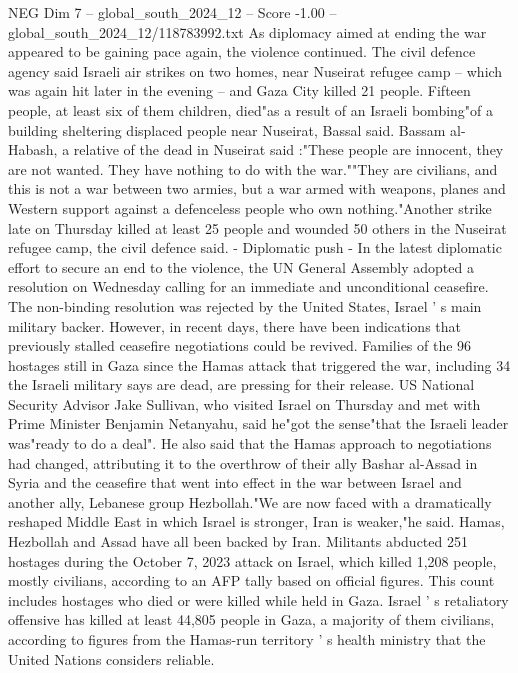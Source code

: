 \begin{textsample}{NEG Dim 7 – global\_south\_2024\_12 – Score -1.00 – global\_south\_2024\_12/118783992.txt}
As diplomacy aimed at ending the war appeared to be gaining pace again, the violence continued.
The civil defence agency said Israeli air strikes on two homes, near Nuseirat refugee camp -- which was again hit later in the evening -- and Gaza City killed 21 people.
Fifteen people, at least six of them children, died"as a result of an Israeli bombing"of a building sheltering displaced people near Nuseirat, Bassal said.
Bassam al-Habash, a relative of the dead in Nuseirat said :"These people are innocent, they are not wanted.
They have nothing to do with the war.""They are civilians, and this is not a war between two armies, but a war armed with weapons, planes and Western support against a defenceless people who own nothing."Another strike late on Thursday killed at least 25 people and wounded 50 others in the Nuseirat refugee camp, the civil defence said. - Diplomatic push - In the latest diplomatic effort to secure an end to the violence, the UN General Assembly adopted a resolution on Wednesday calling for an immediate and unconditional ceasefire.
The non-binding resolution was rejected by the United States, Israel ' s main military backer.
However, in recent days, there have been indications that previously stalled ceasefire negotiations could be revived.
Families of the 96 hostages still in Gaza since the Hamas attack that triggered the war, including 34 the Israeli military says are dead, are pressing for their release.
US National Security Advisor Jake Sullivan, who visited Israel on Thursday and met with Prime Minister Benjamin Netanyahu, said he"got the sense"that the Israeli leader was"ready to do a deal".
He also said that the Hamas approach to negotiations had changed, attributing it to the overthrow of their ally Bashar al-Assad in Syria and the ceasefire that went into effect in the war between Israel and another ally, Lebanese group Hezbollah."We are now faced with a dramatically reshaped Middle East in which Israel is stronger, Iran is weaker,"he said.
Hamas, Hezbollah and Assad have all been backed by Iran.
Militants abducted 251 hostages during the October 7, 2023 attack on Israel, which killed 1,208 people, mostly civilians, according to an AFP tally based on official figures.
This count includes hostages who died or were killed while held in Gaza.
Israel ' s retaliatory offensive has killed at least 44,805 people in Gaza, a majority of them civilians, according to figures from the Hamas-run territory ' s health ministry that the United Nations considers reliable.

\end{textsample}
